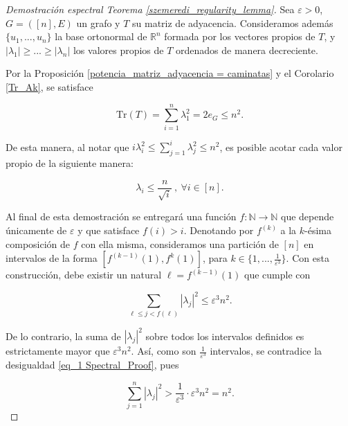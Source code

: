 \documentclass{article}[14pts]
\newcommand{\Tr}{\mathrm{Tr}}
\let\varepsilon=\varepsilon
\begin{document}
\begin{proof}[Demostración espectral Teorema \ref{szemeredi_regularity_lemma}] 
    Sea $\varepsilon > 0$, $G = ([n],E)$ un grafo y $T$ su matriz de adyacencia. Consideramos además $\lbrace u_1,...,u_n\rbrace$ la base ortonormal de $\mathbb{R}^{n}$ formada por los vectores propios de $T$, y $|\lambda_1| \geq ... \geq |\lambda_n|$ los valores propios de $T$ ordenados de manera decreciente.\medskip

    Por la Proposición \ref{potencia_matriz_adyacencia = caminatas} y el Corolario \ref{Tr_Ak}, se satisface\medskip

    \begin{equation} \label{eq_1 Spectral_Proof}
        \Tr(T) = \sum_{i=1}^{n} \lambda_{1}^{2} =  2e_G \leq n^{2}.
    \end{equation}\medskip

    De esta manera, al notar que $i\lambda_{i}^{2} \leq \sum_{j=1}^{i} \lambda_{j}^{2} \leq n^{2}$, es posible acotar cada valor propio de la siguiente manera:\medskip

    \begin{equation} \label{eq_2 Spectral_Proof}
        \lambda_{i} \leq \frac{n}{\sqrt{i}}\ ,\ \forall i\in [n].
    \end{equation}\medskip

    Al final de esta demostración se entregará una función $f:\mathbb{N}\to \mathbb{N}$ que depende únicamente de $\varepsilon$ y que satisface $f(i) > i$. Denotando por $f^{(k)}$ a la $k$-ésima composición de $f$ con ella misma, consideramos una partición de $[n]$ en intervalos de la forma $[f^{(k-1)}(1), f^{k}(1)]$, para $k\in \lbrace 1,...,\frac{1}{\varepsilon^{3}}\rbrace$. Con esta construcción, debe existir un natural $\ell = f^{(k-1)}(1)$ que cumple con\medskip

    \begin{equation} \label{eq_3 Spectral_Proof}
        \sum_{\ell \leq j < f(\ell)} |\lambda_j|^{2} \leq \varepsilon^{3}n^{2}.
    \end{equation}\medskip

    De lo contrario, la suma de $|\lambda_j|^{2}$ sobre todos los intervalos definidos es estrictamente mayor que $\varepsilon^{3}n^{2}$. Así, como son $\frac{1}{\varepsilon^{3}}$ intervalos, se contradice la desigualdad \eqref{eq_1 Spectral_Proof}, pues\medskip

    \begin{equation*}
        \sum_{j=1}^{n} |\lambda_j|^{2} > \frac{1}{\varepsilon^{3}}\cdot \varepsilon^{3}n^{2} = n^{2}.
    \end{equation*}\medskip


\end{proof}
\end{document}
